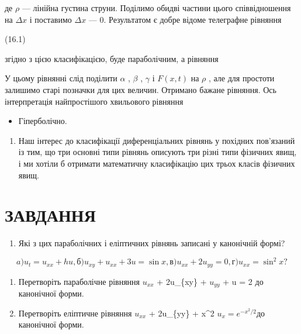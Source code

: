 \documentclass[
  ukrainian,
]{article}
\providecommand{\tightlist}{%
  \setlength{\itemsep}{0pt}\setlength{\parskip}{0pt}}
\begin{document}
де \(\rho\) --- лінійна густина струни. Поділимо обидві частини цього
співвідношення на \(\Delta x\) і поставимо \(\Delta x\) --- 0.
Результатом є добре відоме телеграфне рівняння

(16.1)

згідно з цією класифікацією, буде параболічним, а рівняння

У цьому рівнянні слід поділити \(\alpha\) , \(\beta\) , \(\gamma\) і
\(F(x,t)\) на \(\rho\) , але для простоти залишимо старі позначки для
цих величин. Отримано бажане рівняння. Ось інтерпретація найпростішого
хвильового рівняння

\begin{itemize}
\tightlist
\item
  Гіперболічно.
\end{itemize}

\begin{enumerate}
\def\labelenumi{\arabic{enumi}.}
\setcounter{enumi}{1}
\tightlist
\item
  Наш інтерес до класифікації диференціальних рівнянь у похідних
  пов'язаний із тим, що три основні типи рівнянь описують три різні типи
  фізичних явищ, і ми хотіли б отримати математичну класифікацію цих
  трьох класів фізичних явищ.
\end{enumerate}

\section{ЗАВДАННЯ}\label{ux437ux430ux432ux434ux430ux43dux43dux44f-2}

\begin{enumerate}
\def\labelenumi{\arabic{enumi}.}
\tightlist
\item
  Які з цих параболічних і еліптичних рівнянь записані у канонічній
  формі?
\end{enumerate}

\[
a) u_t = u_{xx} + hu,
б) u_{xy} + u_{xx} + 3u = \sin x,
в) u_{xx} + 2u_{yy} = 0,
г) u_{xx} = \sin^2 x?
\]

\begin{enumerate}
\def\labelenumi{\arabic{enumi}.}
\setcounter{enumi}{1}
\item
  Перетворіть параболічне рівняння \(u_{xx}\) + 2u\_\{xy\} + \(u_{yy}\)
  + u = 2 до канонічної форми.
\item
  Перетворіть еліптичне рівняння \(u_{xx}\) + 2u\_\{yy\} + x\^{}2
  \(u_x = e^{-x^2/2}\)до канонічної форми.
\end{enumerate}
\end{document}
